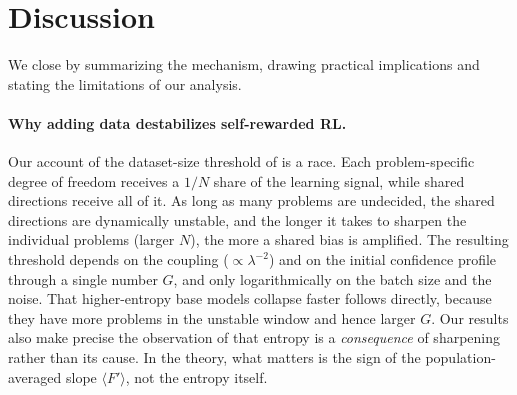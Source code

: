 \section{Discussion}
\label{sec:discussion}

We close by summarizing the mechanism, drawing practical implications and stating the limitations of our analysis.

\paragraph{Why adding data destabilizes self-rewarded RL.}
Our account of the dataset-size threshold of \citet{he2026urlvr} is a race.
Each problem-specific degree of freedom receives a $1/N$ share of the learning signal, while shared directions receive all of it.
As long as many problems are undecided, the shared directions are dynamically unstable, and the longer it takes to sharpen the individual problems (larger $N$), the more a shared bias is amplified.
The resulting threshold depends on the coupling ($\propto\lambda^{-2}$) and on the initial confidence profile through a single number $G$, and only logarithmically on the batch size and the noise.
That higher-entropy base models collapse faster \citep{he2026urlvr} follows directly, because they have more problems in the unstable window and hence larger $G$.
Our results also make precise the observation of \citet{he2026urlvr} that entropy is a \emph{consequence} of sharpening rather than its cause. In the theory, what matters is the sign of the population-averaged slope $\langle F'\rangle$, not the entropy itself.

